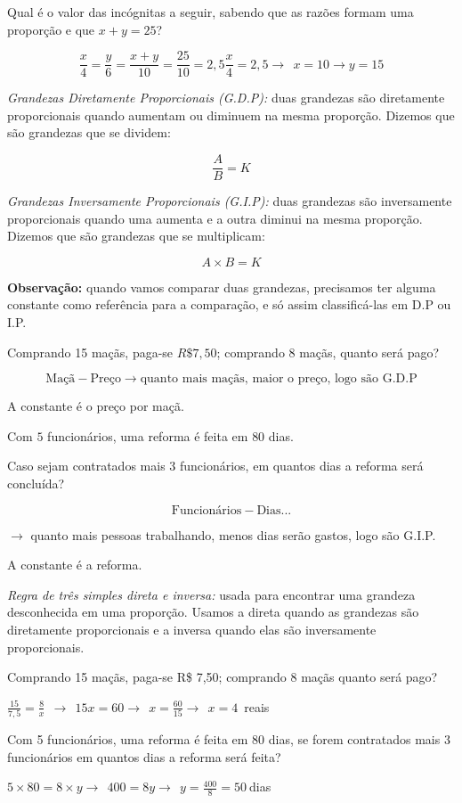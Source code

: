 {\medskip{} 

Qual é o valor das incógnitas a seguir, sabendo que as
razões formam uma proporção e que $x + y = 25$?

$$\frac{x}{4} = \frac{y}{6} = \frac{x + y}{10} = \frac{25}{10} = 2,5\frac{x}{4} = 2,5 \rightarrow \ \ x = 10 \rightarrow y = 15$$

\medskip \noindent   \textit{Grandezas Diretamente Proporcionais (G.D.P):} duas
grandezas são diretamente proporcionais quando aumentam ou diminuem na
mesma proporção. Dizemos que são grandezas que se dividem:

$$\frac{A}{B} = K$$

\medskip \noindent  \textit{{Grandezas Inversamente Proporcionais (G.I.P)}:} duas grandezas
são inversamente proporcionais quando uma aumenta e a outra diminui na
mesma proporção. Dizemos que são grandezas que se multiplicam:

$$A \times B = K$$

\medskip  \noindent \textbf{Observação:} quando vamos comparar duas grandezas, precisamos
ter alguma constante como referência para a comparação, e só assim
classificá-las em D.P ou I.P.

\medskip{} Comprando 15 maçãs, paga-se $R\$7,50$; comprando $8$
maçãs, quanto será pago?

$$\text{Maçã} - \text{Preço} \rightarrow \text{quanto mais maçãs, maior o preço, logo são G.D.P}$$

A constante é o preço por maçã.

\medskip{} 

Com $5$ funcionários, uma reforma é feita em $80$ dias.

Caso sejam contratados mais $3$ funcionários, em quantos dias a reforma
será concluída?

$$\text{Funcionários} - \text{Dias}...$$

$\rightarrow$ quanto mais pessoas trabalhando, menos dias serão gastos, logo são G.I.P.

A constante é a reforma.

\medskip \noindent  \textit{Regra de três simples direta e inversa:} usada para
encontrar uma grandeza desconhecida em uma proporção. Usamos a direta
quando as grandezas são diretamente proporcionais e a inversa quando
elas são inversamente proporcionais.

\medskip{} 

Comprando 15 maçãs, paga-se R\$ 7,50; comprando 8
maçãs quanto será pago?

$\frac{15}{7,5} = \frac{8}{x}\ \  \rightarrow \ \ 15x = 60 \rightarrow \ \ x = \frac{60}{15} \rightarrow \ \ x = 4$\ reais

\medskip{} 

Com 5 funcionários, uma reforma é feita em 80 dias, se
forem contratados mais 3 funcionários em quantos dias a reforma será
feita?

$5 \times 80 = 8 \times y \rightarrow \ \ 400 = 8y \rightarrow \ \ y = \frac{400}{8} = 50\ $dias
}

